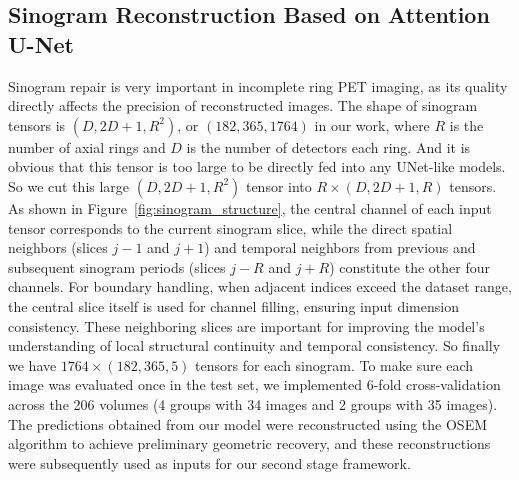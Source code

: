 \documentclass[12pt]{iopart}
\begin{document}

\subsection{Sinogram Reconstruction Based on Attention U-Net}
\label{sec:unet_sinogram}

Sinogram repair is very important in incomplete ring PET imaging, as its quality directly affects the precision of reconstructed images. 
The shape of sinogram tensors is $(D, 2D+1, R^2)$, or $(182, 365, 1764)$ in our work, where $R$ is the number of axial rings and $D$ is the number of detectors each ring. And it is obvious that this tensor is too large to be directly fed into any UNet-like models. So we cut this large $(D, 2D+1, R^2)$ tensor into $R\times(D, 2D+1, R)$ tensors. 
As shown in Figure~\ref{fig:sinogram_structure}, the central channel of each input tensor corresponds to the current sinogram slice, while the direct spatial neighbors (slices $j-1$ and $j+1$) and temporal neighbors from previous and subsequent sinogram periods (slices $j-R$ and $j+R$) constitute the other four channels. For boundary handling, when adjacent indices exceed the dataset range, the central slice itself is used for channel filling, ensuring input dimension consistency. These neighboring slices are important for improving the model's understanding of local structural continuity and temporal consistency. So finally we have $1764\times(182, 365, 5)$ tensors for each sinogram. 
To make sure each image was evaluated once in the test set, we implemented 6-fold cross-validation across the 206 volumes (4 groups with 34 images and 2 groups with 35 images). The predictions obtained from our model were reconstructed using the OSEM algorithm to achieve preliminary geometric recovery, and these reconstructions were subsequently used as inputs for our second stage framework.
\end{document}
